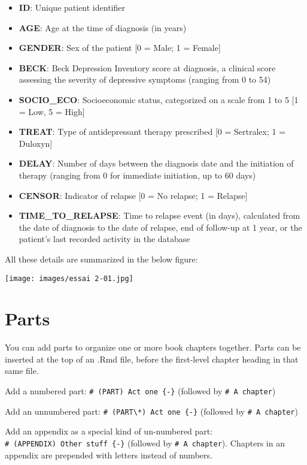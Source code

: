 \documentclass[
]{book}
\begin{document}
\begin{itemize}
\item
  \textbf{ID}: Unique patient identifier
\item
  \textbf{AGE}: Age at the time of diagnosis (in years)
\item
  \textbf{GENDER}: Sex of the patient {[}0 = Male; 1 = Female{]}
\item
  \textbf{BECK}: Beck Depression Inventory score at diagnosis, a clinical score assessing the severity of depressive symptoms (ranging from 0 to 54)
\item
  \textbf{SOCIO\_ECO}: Socioeconomic status, categorized on a scale from 1 to 5 {[}1 = Low, 5 = High{]}
\item
  \textbf{TREAT}: Type of antidepressant therapy prescribed {[}0 = Sertralex; 1 = Duloxyn{]}
\item
  \textbf{DELAY}: Number of days between the diagnosis date and the initiation of therapy (ranging from 0 for immediate initiation, up to 60 days)
\item
  \textbf{CENSOR}: Indicator of relapse {[}0 = No relapse; 1 = Relapse{]}
\item
  \textbf{TIME\_TO\_RELAPSE}: Time to relapse event (in days), calculated from the date of diagnosis to the date of relapse, end of follow-up at 1 year, or the patient's last recorded activity in the database
\end{itemize}

All these details are summarized in the below figure:

\texttt{[image: images/essai 2-01.jpg]}

\chapter{Parts}\label{parts}

You can add parts to organize one or more book chapters together. Parts can be inserted at the top of an .Rmd file, before the first-level chapter heading in that same file.

Add a numbered part: \texttt{\#\ (PART)\ Act\ one\ \{-\}} (followed by \texttt{\#\ A\ chapter})

Add an unnumbered part: \texttt{\#\ (PART\textbackslash{}*)\ Act\ one\ \{-\}} (followed by \texttt{\#\ A\ chapter})

Add an appendix as a special kind of un-numbered part: \texttt{\#\ (APPENDIX)\ Other\ stuff\ \{-\}} (followed by \texttt{\#\ A\ chapter}). Chapters in an appendix are prepended with letters instead of numbers.

  
\end{document}

